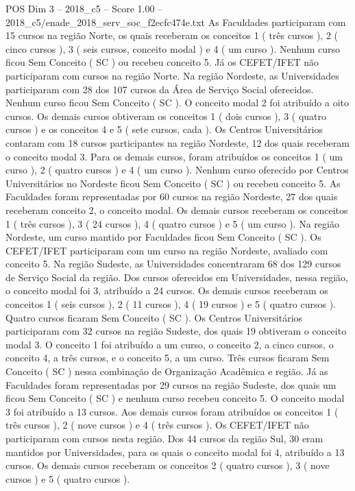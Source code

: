 \begin{textsample}{POS Dim 3 – 2018\_c5 – Score 1.00 – 2018\_c5/enade\_2018\_serv\_soc\_f2ecfc474e.txt}
As Faculdades participaram com 15 cursos na região Norte, os quais receberam os conceitos 1 ( três cursos ), 2 ( cinco cursos ), 3 ( seis cursos, conceito modal ) e 4 ( um curso ).
Nenhum curso ficou Sem Conceito ( SC ) ou recebeu conceito 5.
Já os CEFET/IFET não participaram com cursos na região Norte.
Na região Nordeste, as Universidades participaram com 28 dos 107 cursos da Área de Serviço Social oferecidos.
Nenhum curso ficou Sem Conceito ( SC ).
O conceito modal 2 foi atribuído a oito cursos.
Os demais cursos obtiveram os conceitos 1 ( dois cursos ), 3 ( quatro cursos ) e os conceitos 4 e 5 ( sete cursos, cada ).
Os Centros Universitários contaram com 18 cursos participantes na região Nordeste, 12 dos quais receberam o conceito modal 3.
Para os demais cursos, foram atribuídos os conceitos 1 ( um curso ), 2 ( quatro cursos ) e 4 ( um curso ).
Nenhum curso oferecido por Centros Universitários no Nordeste ficou Sem Conceito ( SC ) ou recebeu conceito 5.
As Faculdades foram representadas por 60 cursos na região Nordeste, 27 dos quais receberam conceito 2, o conceito modal.
Os demais cursos receberam os conceitos 1 ( três cursos ), 3 ( 24 cursos ), 4 ( quatro cursos ) e 5 ( um curso ).
Na região Nordeste, um curso mantido por Faculdades ficou Sem Conceito ( SC ).
Os CEFET/IFET participaram com um curso na região Nordeste, avaliado com conceito 5.
Na região Sudeste, as Universidades concentraram 68 dos 129 cursos de Serviço Social da região.
Dos cursos oferecidos em Universidades, nessa região, o conceito modal foi 3, atribuído a 24 cursos.
Os demais cursos receberam os conceitos 1 ( seis cursos ), 2 ( 11 cursos ), 4 ( 19 cursos ) e 5 ( quatro cursos ).
Quatro cursos ficaram Sem Conceito ( SC ).
Os Centros Universitários participaram com 32 cursos na região Sudeste, dos quais 19 obtiveram o conceito modal 3.
O conceito 1 foi atribuído a um curso, o conceito 2, a cinco cursos, o conceito 4, a três cursos, e o conceito 5, a um curso.
Três cursos ficaram Sem Conceito ( SC ) nessa combinação de Organização Acadêmica e região.
Já as Faculdades foram representadas por 29 cursos na região Sudeste, dos quais um ficou Sem Conceito ( SC ) e nenhum curso recebeu conceito 5.
O conceito modal 3 foi atribuído a 13 cursos.
Aos demais cursos foram atribuídos os conceitos 1 ( três cursos ), 2 ( nove cursos ) e 4 ( três cursos ).
Os CEFET/IFET não participaram com cursos nesta região.
Dos 44 cursos da região Sul, 30 eram mantidos por Universidades, para os quais o conceito modal foi 4, atribuído a 13 cursos.
Os demais cursos receberam os conceitos 2 ( quatro cursos ), 3 ( nove cursos ) e 5 ( quatro cursos ).

\end{textsample}
